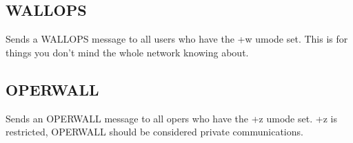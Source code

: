 \subsection{WALLOPS}

 \literal{:}

	Sends a WALLOPS message to all users who have the +w umode set. This is
	for things you don't mind the whole network knowing about.


\subsection{OPERWALL}

 \literal{:}
	Sends an OPERWALL message to all opers who have the +z umode set. +z is
	restricted, OPERWALL should be considered private communications.
